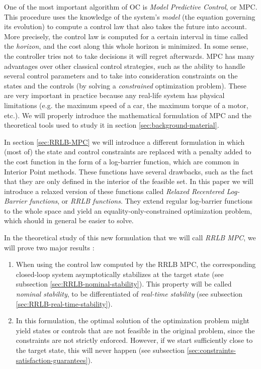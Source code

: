 \documentclass[12pt]{article}
\begin{document}
One of the most important algorithm of OC is \textit{Model Predictive Control}, or MPC.
This procedure uses the knowledge of the system's \textit{model} (the equation governing its evolution) to compute a control law that also takes the future into account.
More precisely, the control law is computed for a certain interval in time called the \textit{horizon}, and the cost along this whole horizon is minimized.
In some sense, the controller tries not to take decisions it will regret afterwards.
MPC has many advantages over other classical control strategies, such as the ability to handle several control parameters and to take into consideration constraints on the states and the controls (by solving a \textit{constrained} optimization problem).
These are very important in practice because any real-life system has physical limitations (e.g. the maximum speed of a car, the maximum torque of a motor, etc.).
We will properly introduce the mathematical formulation of MPC and the theoretical tools used to study it in section \ref{sec:background-material}.

In section \ref{sec:RRLB-MPC} we will introduce a different formulation in which (most of) the state and control constraints are replaced with a penalty added to the cost function in the form of a log-barrier function, which are common in Interior Point methods.
These functions have several drawbacks, such as the fact that they are only defined in the interior of the feasible set.
In this paper we will introduce a relaxed version of these functions called \textit{Relaxed Recentered Log-Barrier functions}, or \textit{RRLB functions}.
They extend regular log-barrier functions to the whole space and yield an equality-only-constrained optimization problem, which should in general be easier to solve.

In the theoretical study of this new formulation that we will call \textit{RRLB MPC}, we will prove two major results :

\begin{enumerate}
	\item When using the control law computed by the RRLB MPC, the corresponding closed-loop system asymptotically stabilizes at the target state (see subsection \ref{sec:RRLB-nominal-stability}).
	This property will be called \textit{nominal stability}, to be differentiated of \textit{real-time stability} (see subsection \ref{sec:RRLB-real-time-stability}).
	\item In this formulation, the optimal solution of the optimization problem might yield states or controls that are not feasible in the original problem, since the constraints are not strictly enforced.
	However, if we start sufficiently close to the target state, this will never happen (see subsection \ref{sec:constraints-satisfaction-guarantees}).
\end{enumerate}
\end{document}
